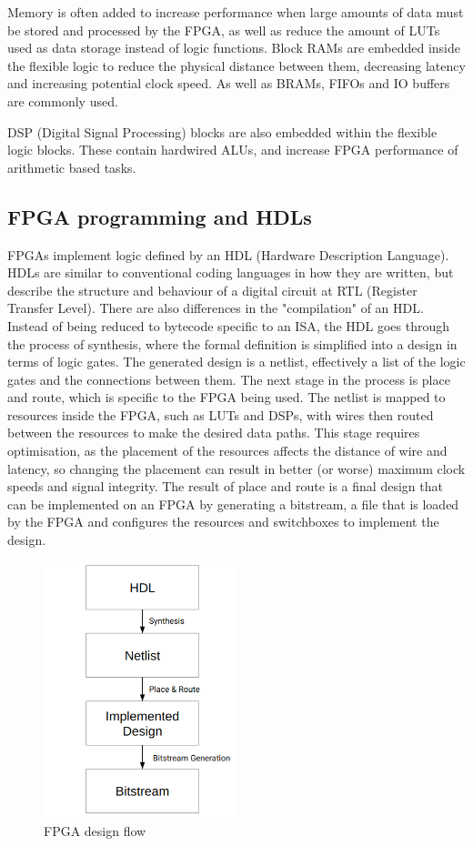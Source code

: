Memory is often added to increase performance when large amounts of data must be stored and processed by the FPGA, as well as reduce the amount of LUTs used as data storage instead of logic functions. Block RAMs are embedded inside the flexible logic to reduce the physical distance between them, decreasing latency and increasing potential clock speed. As well as BRAMs, FIFOs and IO buffers are commonly used.

DSP (Digital Signal Processing) blocks are also embedded within the flexible logic blocks. These contain hardwired ALUs, and increase FPGA performance of arithmetic based tasks.

\subsection{FPGA programming and HDLs}
FPGAs implement logic defined by an HDL (Hardware Description Language). HDLs are similar to conventional coding languages in how they are written, but describe the structure and behaviour of a digital circuit at RTL (Register Transfer Level). There are also differences in the "compilation" of an HDL. Instead of being reduced to bytecode specific to an ISA, the HDL goes through the process of synthesis, where the formal definition is simplified into a design in terms of logic gates. The generated design is a netlist, effectively a list of the logic gates and the connections between them. The next stage in the process is place and route, which is specific to the FPGA being used. The netlist is mapped to resources inside the FPGA, such as LUTs and DSPs, with wires then routed between the resources to make the desired data paths. This stage requires optimisation, as the placement of the resources affects the distance of wire and latency, so changing the placement can result in better (or worse) maximum clock speeds and signal integrity. The result of place and route is a final design that can be implemented on an FPGA by generating a bitstream, a file that is loaded by the FPGA and configures the resources and switchboxes to implement the design.

\begin{figure}[H]
    \centering
    \includegraphics[width=0.5\textwidth]{img/fpga_synthesis_impl.png}
    \caption{FPGA design flow}
    \label{fig:fpga_design_flow}
\end{figure}

